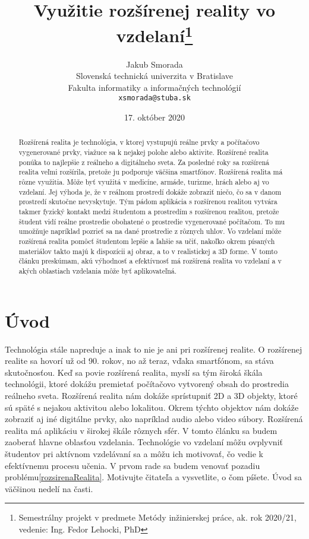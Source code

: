 \documentclass[10pt,twoside,slovak,a4paper]{article}
\title{Využitie rozšírenej reality vo vzdelaní\thanks{Semestrálny projekt v predmete Metódy inžinierskej práce, ak. rok 2020/21, vedenie: Ing. Fedor Lehocki, PhD}}
\author{Jakub Smorada\\[2pt]
	{\small Slovenská technická univerzita v Bratislave}\\
	{\small Fakulta informatiky a informačných technológií}\\
	{\small \texttt{xsmorada@stuba.sk}}
	}
\date{\small 17. október 2020}
\begin{document}
\maketitle

\begin{abstract}
Rozšírená realita je technológia, v ktorej vystupujú reálne prvky a počítačovo vygenerované prvky, viažuce sa k nejakej polohe alebo aktivite.\cite{Yuen2011} 
Rozšírené realita ponúka to najlepšie z reálneho a digitálneho sveta. 
Za posledné roky sa rozšírená realita veľmi rozšírila, pretože ju podporuje väčšina smartfónov. 
Rozšírená realita má rôzne využitia. 
Môže byť využitá v medicíne, armáde, turizme, hrách alebo aj vo vzdelaní. 
Jej výhoda je, že v reálnom prostredí dokáže zobraziť niečo, čo sa v danom prostredí skutočne nevyskytuje. 
Tým pádom aplikácia s rozšírenou realitou vytvára takmer fyzický kontakt medzi študentom a prostredím s rozšírenou realitou, pretože študent vidí reálne prostredie obohatené o prostredie vygenerované počítačom. 
To mu umožňuje napríklad pozrieť sa na dané prostredie z rôznych uhlov. 
Vo vzdelaní môže rozšírená realita pomôcť študentom lepšie a ľahšie sa učiť, nakoľko okrem písaných materiálov takto majú k dispozícii aj obraz, a to v realistickej a 3D forme. 
V tomto článku preskúmam, akú výhodnosť a efektívnosť má rozšírená realita vo vzdelaní a v akých oblastiach vzdelania môže byť aplikovateľná.
\end{abstract}

\section{Úvod}
Technológia stále napreduje a inak to nie je ani pri rozšírenej realite.  
O rozšírenej realite sa hovorí už od 90. rokov, no až teraz, vďaka smartfónom, sa stáva skutočnosťou.\cite{Yuen2011} 
Keď sa povie rozšírená realita, myslí sa tým široká škála technológii, ktoré dokážu premietať počítačovo vytvorený obsah do prostredia reálneho sveta.\cite{Yuen2011}
Rozšírená realita nám dokáže sprístupniť 2D a 3D objekty, ktoré sú späté s nejakou aktivitou alebo lokalitou. 
Okrem týchto objektov nám dokáže zobraziť aj iné digitálne prvky, ako napríklad audio alebo video súbory.\cite{Yuen2011} 
Rozšírená realita má aplikáciu v širokej škále rôznych sfér. V tomto článku sa budem zaoberať hlavne oblasťou vzdelania. 
Technológie vo vzdelaní môžu ovplyvniť študentov pri aktívnom vzdelávaní sa a môžu ich motivovať, čo vedie k efektívnemu procesu učenia.\cite{Saidin2015}
V prvom rade sa budem venovať pozadiu problému\ref{rozsirenaRealita}.
Motivujte čitateľa a vysvetlite, o čom píšete. Úvod sa väčšinou nedelí na časti.
\end{document}
